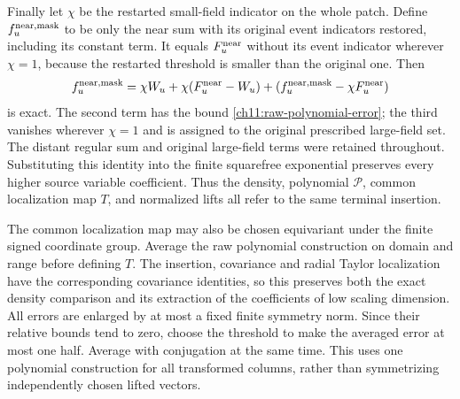 Finally let $\chi$ be the restarted small-field indicator on the
whole patch. Define $f_u^{\rm near,mask}$ to be only the near sum
with its original event indicators restored, including its constant term.
It equals $F_u^{\rm near}$ without its event indicator wherever $\chi=1$,
because the restarted threshold is smaller than the original one.
Then
\[
 f_u^{\rm near,mask}=\chi W_u+\chi(F_u^{\rm near}-W_u)
             +(f_u^{\rm near,mask}-\chi F_u^{\rm near})
\]
is exact. The second term has the bound
\eqref{ch11:raw-polynomial-error}; the third vanishes wherever
$\chi=1$ and is assigned to the original prescribed large-field set.
The distant regular sum and original large-field terms were
retained throughout. Substituting this identity into the finite
squarefree exponential preserves every higher source variable coefficient.
Thus the density, polynomial $\mathscr P$, common
localization map $T$, and normalized lifts all refer to the same
terminal insertion.


The common localization map may also be chosen equivariant under the
finite signed coordinate group. Average the raw polynomial
construction on domain and range before defining $T$.
The insertion, covariance and radial Taylor localization have the
corresponding covariance identities, so this preserves both
the exact density comparison and its extraction of the coefficients of low scaling dimension.
All errors are enlarged by at most a fixed finite symmetry
norm. Since their relative bounds tend to zero, choose the
threshold to make the averaged error at most one half.
Average with conjugation at the same time. This uses one
polynomial construction for all transformed columns, rather
than symmetrizing independently chosen lifted vectors.

